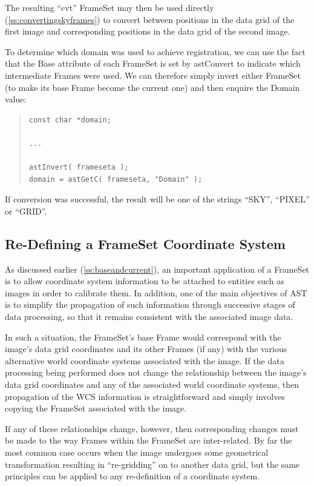 \documentclass[twoside,11pt]{article}
\newcommand{\htmlref}[2]{#1}
\newcommand{\secref}[1]{\S\ref{#1}}
\renewcommand{\secref}[1]{\ref{#1}}
\begin{document}
The resulting ``cvt'' FrameSet may then be used directly
(\secref{ss:convertingskyframes}) to convert between positions in the
data grid of the first image and corresponding positions in the data
grid of the second image.

To determine which domain was used to achieve registration,
we can use the fact that the \htmlref{Base}{Base} attribute of each FrameSet is set by
astConvert to indicate which intermediate Frames were used. We
can therefore simply invert either FrameSet (to make its base Frame
become the current one) and then enquire the \htmlref{Domain}{Domain} value:

\begin{quote}
\small
\begin{verbatim}
const char *domain;

...

astInvert( frameseta );
domain = astGetC( frameseta, "Domain" );
\end{verbatim}
\normalsize
\end{quote}

If conversion was successful, the result will be one of the strings
``SKY'', ``PIXEL'' or ``GRID''.

\subsection{\label{ss:remapframe}Re-Defining a FrameSet Coordinate System}

As discussed earlier (\secref{ss:baseandcurrent}), an important
application of a \htmlref{FrameSet}{FrameSet} is to allow coordinate system information to
be attached to entities such as images in order to calibrate them. In
addition, one of the main objectives of AST is to simplify the
propagation of such information through successive stages of data
processing, so that it remains consistent with the associated image
data.

In such a situation, the FrameSet's base \htmlref{Frame}{Frame} would correspond with
the image's data grid coordinates and its other Frames (if any) with
the various alternative world coordinate systems associated with the
image.  If the data processing being performed does not change the
relationship between the image's data grid coordinates and any of the
associated world coordinate systems, then propagation of the WCS
information is straightforward and simply involves copying the
FrameSet associated with the image.

If any of these relationships change, however, then corresponding
changes must be made to the way Frames within the FrameSet are
inter-related. By far the most common case occurs when the image
undergoes some geometrical transformation resulting in ``re-gridding''
on to another data grid, but the same principles can be applied to any
re-definition of a coordinate system.
\end{document}
